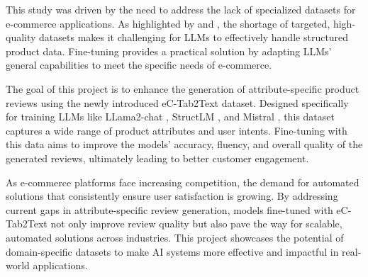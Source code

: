 This study was driven by the need to address the lack of specialized datasets for e-commerce applications. As highlighted by \cite{macková2023promap} and \cite{Wang2023Emotional}, the shortage of targeted, high-quality datasets makes it challenging for LLMs to effectively handle structured product data. Fine-tuning provides a practical solution by adapting LLMs' general capabilities to meet the specific needs of e-commerce.

The goal of this project is to enhance the generation of attribute-specific product reviews using the newly introduced eC-Tab2Text dataset. Designed specifically for training LLMs like LLama2-chat \cite{touvron2023llama}, StructLM \cite{zhuang2024structlm}, and Mistral \cite{jiang2023mistral}, this dataset captures a wide range of product attributes and user intents. Fine-tuning with this data aims to improve the models' accuracy, fluency, and overall quality of the generated reviews, ultimately leading to better customer engagement.

As e-commerce platforms face increasing competition, the demand for automated solutions that consistently ensure user satisfaction is growing. By addressing current gaps in attribute-specific review generation, models fine-tuned with eC-Tab2Text not only improve review quality but also pave the way for scalable, automated solutions across industries. This project showcases the potential of domain-specific datasets to make AI systems more effective and impactful in real-world applications.